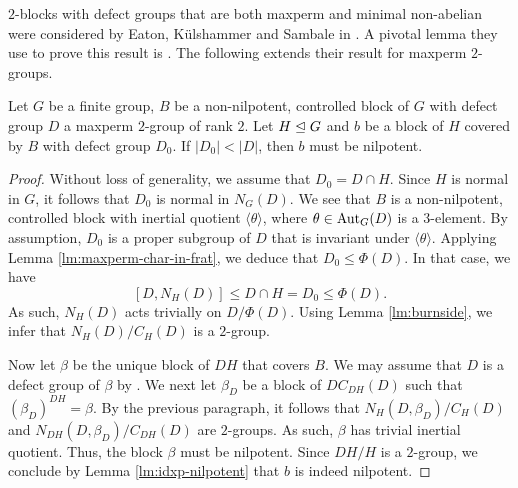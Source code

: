 \documentclass[bysection, amsart]{standard}
\begin{document}
$2$-blocks with defect groups that are both maxperm and minimal non-abelian were considered by Eaton, K{\"u}lshammer and Sambale in \cite{paper:ekb-block-mna}. A pivotal lemma they use to prove this result is \cite[Lemma 5]{paper:ekb-block-mna}. The following extends their result for maxperm $2$-groups.

\begin{lemma} \label{lm:smaller-not-nilpotent}
    Let $G$ be a finite group, $B$ be a non-nilpotent, controlled block of $G$ with defect group $D$ a maxperm $2$-group of rank $2$. Let $H \trianglelefteq G$ and $b$ be a block of $H$ covered by $B$ with defect group $D_0$. If $|D_0| < |D|$, then $b$ must be nilpotent.
\end{lemma}
\begin{proof}
    Without loss of generality, we assume that $D_0 = D \cap H$. Since $H$ is normal in $G$, it follows that $D_0$ is normal in $N_G(D)$. We see that $B$ is a non-nilpotent, controlled block with inertial quotient $\langle \theta \rangle$, where $\theta \in \operatorname{Aut}_G(D)$ is a $3$-element. By assumption, $D_0$ is a proper subgroup of $D$ that is invariant under $\langle \theta \rangle$. Applying Lemma \ref{lm:maxperm-char-in-frat}, we deduce that $D_0 \leq \Phi(D)$. In that case, we have
    \[[D, N_H(D)] \leq D \cap H = D_0 \leq \Phi(D).\]
    As such, $N_H(D)$ acts trivially on $D/\Phi(D)$. Using Lemma \ref{lm:burnside}, we infer that $N_H(D)/C_H(D)$ is a $2$-group. 
    
    Now let $\beta$ be the unique block of $DH$ that covers $B$. We may assume that $D$ is a defect group of $\beta$ by \cite[Theorem E]{paper:p-solvable}. We next let $\beta_D$ be a block of $DC_{DH}(D)$ such that $(\beta_D)^{DH} = \beta$. By the previous paragraph, it follows that $N_H(D, \beta_D)/C_H(D)$ and $N_{DH}(D, \beta_D)/C_{DH}(D)$ are  $2$-groups. As such, $\beta$ has trivial inertial quotient. Thus, the block $\beta$ must be nilpotent. Since $DH/H$ is a $2$-group, we conclude by Lemma \ref{lm:idxp-nilpotent} that $b$ is indeed nilpotent.
\end{proof}
\end{document}
